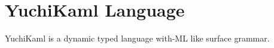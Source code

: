 \section{YuchiKaml Language}

YuchiKaml is a dynamic typed language with-ML like surface grammar.


